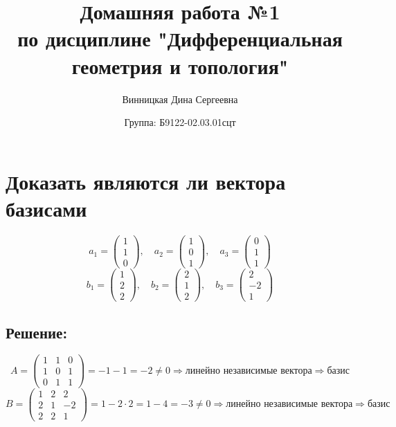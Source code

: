 \documentclass{article}
\title{\vspace{-1cm}Домашняя работа №1 \\ по дисциплине "Дифференциальная геометрия и топология"}
\author{Винницкая Дина Сергеевна}
\date{Группа: Б9122-02.03.01сцт}
\begin{document}
	
	\maketitle

	\section{Доказать являются ли вектора базисами} 
        
        \[
        a_1 = \begin{pmatrix} 1 \\ 1 \\ 0 \end{pmatrix}, \quad a_2 = \begin{pmatrix} 1 \\ 0 \\ 1 \end{pmatrix}, \quad a_3 = \begin{pmatrix} 0 \\ 1 \\ 1 \end{pmatrix}
        \]
        \[
        b_1 = \begin{pmatrix} 1 \\ 2 \\ 2 \end{pmatrix}, \quad b_2 = \begin{pmatrix} 2 \\ 1 \\ 2 \end{pmatrix}, \quad b_3 = \begin{pmatrix} 2 \\ -2 \\ 1 \end{pmatrix}
        \]
        
	\subsection{Решение:}

        \[
        A = \begin{pmatrix}
        1 & 1 & 0 \\
        1 & 0 & 1 \\
        0 & 1 & 1
        \end{pmatrix}
        = -1 - 1 = -2 \neq 0  \Longrightarrow  \text{линейно независимые вектора} \Longrightarrow  \text{базис}
        \]
        \[
        B = \begin{pmatrix}
        1 & 2 & 2 \\
        2 & 1 & -2 \\
        2 & 2 & 1
        \end{pmatrix}
         = 1 - 2 \cdot 2 = 1 - 4 = -3 \neq 0  \Longrightarrow \text{линейно независимые вектора}  \Longrightarrow  \text{базис}
        \]
\end{document}

